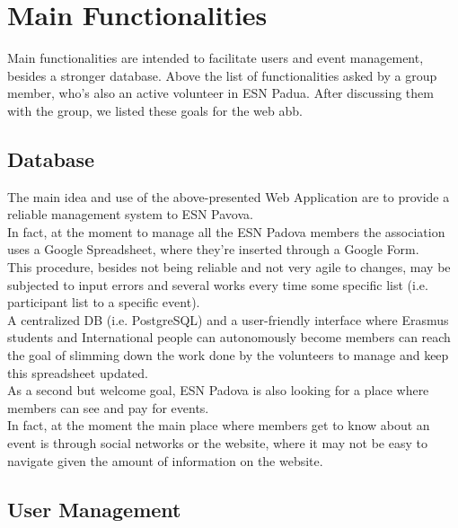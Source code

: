 \section{Main Functionalities}

Main functionalities are intended to facilitate users and event management, besides a stronger database.
Above the list of functionalities asked by a group member, who's also an active volunteer in ESN Padua.
After discussing them  with the group, we listed these goals for the web abb.

\subsection{Database}
The main idea and use of the above-presented Web Application are to provide a reliable management system to ESN Pavova. \\
In fact, at the moment to manage all the ESN Padova members the association uses a Google Spreadsheet, where they're inserted 
through a Google Form. \\
This procedure, besides not being reliable and not very agile to changes, may be subjected to input errors and several works 
every time some specific list (i.e. participant list to a specific event).\\
A centralized DB (i.e. PostgreSQL) and a user-friendly interface where Erasmus students and International people can autonomously 
become members can reach the goal of slimming down the work done by the volunteers to manage and keep this spreadsheet updated.\\
As a second but welcome goal, ESN Padova is also looking for a place where members can see and pay for events.\\
In fact, at the moment the main place where members get to know about an event is through social networks or the website, where it
may not be easy to navigate given the amount of information on the website.
\subsection{User Management}


